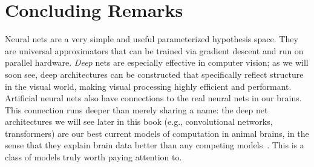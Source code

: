 




\section{Concluding Remarks}
Neural nets are a very simple and useful parameterized hypothesis space. They are universal approximators that can be trained via gradient descent and run on parallel hardware. \textit{Deep} nets are especially effective in computer vision; as we will soon see, deep architectures can be constructed that specifically reflect structure in the visual world, making visual processing highly efficient and performant. Artificial neural nets also have connections to the real neural nets in our brains. This connection runs deeper than merely sharing a name: the deep net architectures we will see later in this book (e.g., convolutional networks, transformers) are our best current models of computation in animal brains, in the sense that they explain brain data better than any competing models~\cite{Schrimpf2020integrative}. This is a class of models truly worth paying attention to. %